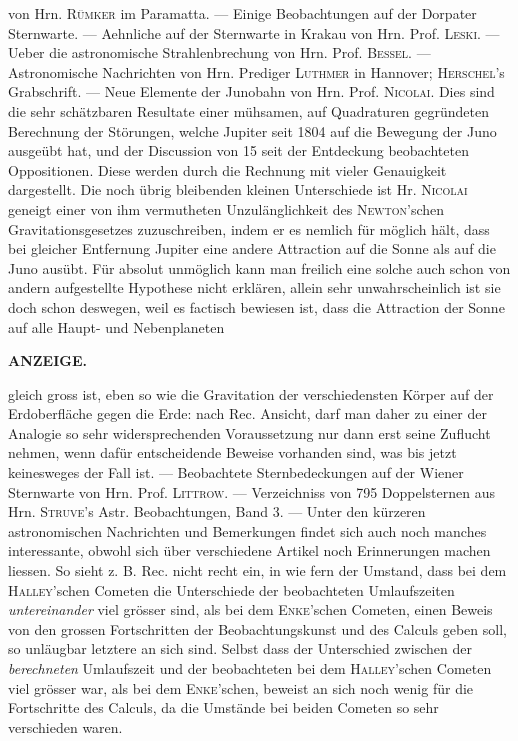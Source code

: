von Hrn. \textsc{Rümker} im Paramatta. --- Einige Beobachtungen auf der Dorpater Sternwarte. --- Aehnliche auf der Sternwarte in Krakau von Hrn. Prof. \textsc{Leski}. --- Ueber die astronomische Strahlenbrechung von Hrn. Prof. \textsc{Bessel}. --- Astronomische Nachrichten von Hrn. Prediger \textsc{Luthmer} in Hannover; \textsc{Herschel}'s Grabschrift. --- Neue Elemente der Junobahn von Hrn. Prof. \textsc{Nicolai}. Dies sind die sehr schätzbaren Resultate einer mühsamen, auf Quadraturen gegründeten Berechnung der Störungen, welche Jupiter seit 1804 auf die Bewegung der Juno ausgeübt hat, und der Discussion von 15 seit der Entdeckung beobachteten Oppositionen. Diese werden durch die Rechnung mit vieler Genauigkeit dargestellt. Die noch übrig bleibenden kleinen Unterschiede ist Hr. \textsc{Nicolai} geneigt einer von ihm vermutheten Unzulänglichkeit des \textsc{Newton}'schen Gravitationsgesetzes zuzuschreiben, indem er es nemlich für möglich hält, dass bei gleicher Entfernung Jupiter eine andere Attraction auf die Sonne als auf die Juno ausübt. Für absolut unmöglich kann man freilich eine solche auch schon von andern aufgestellte Hypothese nicht erklären, allein sehr unwahrscheinlich ist sie doch schon deswegen, weil es factisch bewiesen ist, dass die Attraction der Sonne auf alle Haupt- und Nebenplaneten\par
{}
\clearpage
\thispagestyle{empty}
\noindent{}%
%
\parbox[t]{\dimexpr\linewidth-24mm\relax}{\centering\footnotesize\bfseries ANZEIGE.\par}%
\makebox[12mm][r]{}\par\medskip
\noindent gleich gross ist, eben so wie die Gravitation der verschiedensten Körper auf der Erdoberfläche gegen die Erde: nach Rec. Ansicht, darf man daher zu einer der Analogie so sehr widersprechenden Voraussetzung nur dann erst seine Zuflucht nehmen, wenn dafür entscheidende Beweise vorhanden sind, was bis jetzt keinesweges der Fall ist. --- Beobachtete Sternbedeckungen auf der Wiener Sternwarte von Hrn. Prof. \textsc{Littrow}. --- Verzeichniss von 795 Doppelsternen aus Hrn. \textsc{Struve}'s Astr. Beobachtungen, Band 3. --- Unter den kürzeren astronomischen Nachrichten und Bemerkungen findet sich auch noch manches interessante, obwohl sich über verschiedene Artikel noch Erinnerungen machen liessen. So sieht z. B. Rec. nicht recht ein, in wie fern der Umstand, dass bei dem \textsc{Halley}'schen Cometen die Unterschiede der beobachteten Umlaufszeiten \emph{untereinander} viel grösser sind, als bei dem \textsc{Enke}'schen Cometen, einen Beweis von den grossen Fortschritten der Beobachtungskunst und des Calculs geben soll, so unläugbar letztere an sich sind. Selbst dass der Unterschied zwischen der \emph{berechneten} Umlaufszeit und der beobachteten bei dem \textsc{Halley}'schen Cometen viel grösser war, als bei dem \textsc{Enke}'schen, beweist an sich noch wenig für die Fortschritte des Calculs, da die Umstände bei beiden Cometen so sehr verschieden waren.
